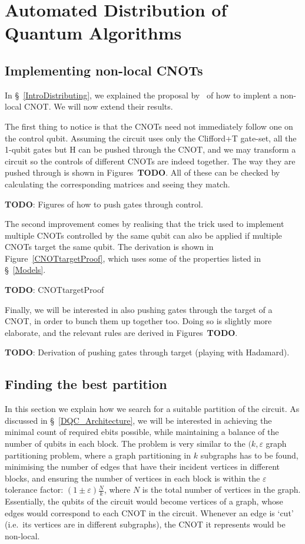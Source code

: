 \chapter{Automated Distribution of Quantum Algorithms}
\label{chap:Project}

\section{Implementing non-local CNOTs}
\label{NonLocalGates}

In \S~\ref{IntroDistributing}, we explained the proposal by~\citet{NonLocalCNOT} of how to implent a non-local CNOT. We will now extend their results.

The first thing to notice is that the CNOTs need not immediately follow one on the control qubit. Assuming the circuit uses only the Clifford+T gate-set, all the 1-qubit gates but H can be pushed through the CNOT, and we may transform a circuit so the controls of different CNOTs are indeed together. The way they are pushed through is shown in Figures~\textbf{TODO}. All of these can be checked by calculating the corresponding matrices and seeing they match.

\textbf{TODO}: Figures of how to push gates through control.

The second improvement comes by realising that the trick used to implement multiple CNOTs controlled by the same qubit can also be applied if multiple CNOTs target the same qubit. The derivation is shown in Figure~\ref{CNOTtargetProof}, which uses some of the properties listed in \S~\ref{Models}.

\textbf{TODO}: CNOTtargetProof

Finally, we will be interested in also pushing gates through the target of a CNOT, in order to bunch them up together too. Doing so is slightly more elaborate, and the relevant rules are derived in Figures~\textbf{TODO}.

\textbf{TODO}: Derivation of pushing gates through target (playing with Hadamard).



\section{Finding the best partition}

In this section we explain how we search for a suitable partition of the circuit. As discussed in \S~\ref{DQC_Architecture}, we will be interested in achieving the minimal count of required ebits possible, while maintaining a balance of the number of qubits in each block. The problem is very similar to the \((k,\varepsilon\) graph partitioning problem, where a graph partitioning in \(k\) subgraphs has to be found, minimising the number of edges that have their incident vertices in different blocks, and ensuring the number of vertices in each block is within the \(\varepsilon\) tolerance factor: \((1 \pm \varepsilon)\frac{N}{k}\), where \(N\) is the total number of vertices in the graph. Essentially, the qubits of the circuit would become vertices of a graph, whose edges would correspond to each CNOT in the circuit. Whenever an edge is `cut' (i.e.\ its vertices are in different subgraphs), the CNOT it represents would be non-local.

